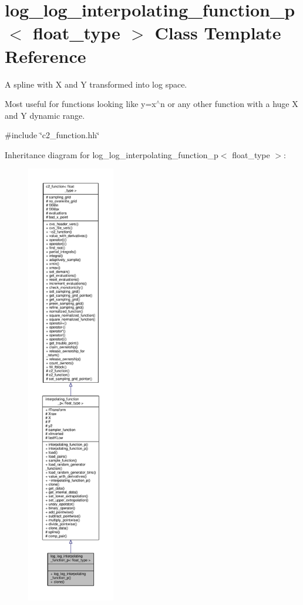 \hypertarget{classlog__log__interpolating__function__p}{}\section{log\+\_\+log\+\_\+interpolating\+\_\+function\+\_\+p$<$ float\+\_\+type $>$ Class Template Reference}
\label{classlog__log__interpolating__function__p}


A spline with X and Y transformed into log space.

Most useful for functions looking like y=x$^\wedge$n or any other function with a huge X and Y dynamic range.  




{\ttfamily \#include \char`\"{}c2\+\_\+function.\+hh\char`\"{}}



Inheritance diagram for log\+\_\+log\+\_\+interpolating\+\_\+function\+\_\+p$<$ float\+\_\+type $>$\+:
\nopagebreak
\begin{figure}[H]
\begin{center}
\leavevmode
\includegraphics[height=550pt]{classlog__log__interpolating__function__p__inherit__graph}
\end{center}
\end{figure}


